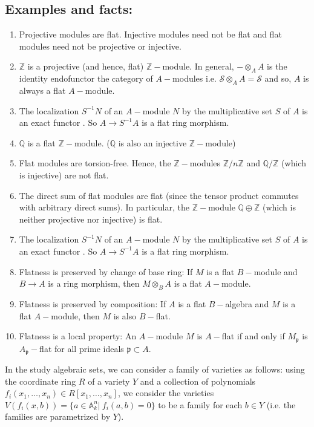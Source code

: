 \documentclass[12pt]{article}
\theoremstyle{mytheoremstyle}
\newcommand{\bZ}{\mathbb{Z}}
\newcommand{\bQ}{\mathbb{Q}}
\newcommand{\cS}{\mathcal{S}}
\begin{document}
\subsection*{Examples and facts:}
\begin{enumerate}
    \item Projective modules are flat. Injective modules need not be flat
        and flat modules need not be projective or injective.
    \item $\mathbb{Z}$ is a projective (and hence, flat) $\bZ-$module.
        In general, $-\otimes_A A$ is the identity endofunctor
        the category of $A-$modules
        i.e. $\cS\otimes_A A = \cS$ and so, $A$ is always a flat $A-$module.
    \item The localization $S^{-1}N$ of an $A-$module $N$ by the multiplicative
        set $S$ of $A$ is an exact functor . So $A\to S^{-1}A$ is a flat ring
        morphism.
    \item $\bQ$ is a flat $\bZ-$module. ($\bQ$ is also an injective
        $\bZ-$module)
    \item Flat modules are torsion-free. Hence, the $\bZ-$modules
        $\bZ/n\bZ$ and $\bQ/\bZ$ (which is injective) are not flat.
    \item The direct sum of flat modules are flat (since the tensor
        product commutes with arbitrary direct sums). In particular,
        the $\bZ-$module $\bQ\oplus\bZ$ (which is neither projective
        nor injective) is flat.
    \item The localization $S^{-1}N$ of an $A-$module $N$ by the multiplicative
        set $S$ of $A$ is an exact functor . So $A\to S^{-1}A$ is a flat ring
        morphism.
    \item Flatness is preserved by change of base ring:
        If $M$ is a flat $B-$module and $B\to A$ is a ring morphism,
        then $M\otimes_B A$ is a flat $A-$module.
    \item Flatness is preserved by composition:
        If $A$ is a flat $B-$algebra and $M$ is a flat $A-$module, then
        $M$ is also $B-$flat.
    \item Flatness is a local property:
        An $A-$module $M$ is $A-$flat if and only if $M_\mathfrak{p}$
        is $A_\mathfrak{p}-$flat for all prime ideals $\mathfrak{p}
        \subset A$.
\end{enumerate}

In the study algebraic sets, we can consider a family of varieties as
follows: using the coordinate ring $R$ of a variety $Y$ and a collection
of polynomials $f_i(x_1,\ldots,x_n)\in R[x_1,\ldots,x_n]$, we consider
the varieties $V(f_i(x,b))=\{a\in \mathbb{A}^n_k|\ f_i(a,b)=0\}$ to be
a family for each $b\in Y$ (i.e. the families are parametrized by $Y$).

\setcounter{section}{1}
\setcounter{theorem}{1}
\end{document}
